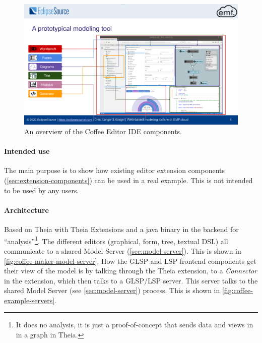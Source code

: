 \begin{figure}[htbp] 
  \centering
  \includegraphics[width=\textwidth]{figures/coffee-maker-example}
  \caption[Coffee Editor IDE Overview]{An overview of the Coffee Editor IDE components.\cite[p.~4]{philiplangerWebbasedModelingTools2020}}\label{fig:coffee-editor-overview}
\end{figure}

\paragraph*{Intended use}
The main purpose is to show how existing editor extension components (\cref{sec:extension-components}) can be used in a real example.
This is not intended to be used by any users.

\paragraph*{Architecture}
Based on Theia with Theia Extensions and a java binary in the backend for ``analysis''\footnote{It does no analysis, it is just a proof-of-concept that sends data and views in in a graph in Theia.}.
The different editors (graphical, form, tree, textual DSL) all communicate to a shared Model Server (\cref{sec:model-server}).
This is shown in \cref{fig:coffee-maker-model-server}.
How the \gls{GLSP} and \gls{LSP} frontend components get their view of the model is by talking through the Theia extension, to a \emph{Connector} in the extension, which then talks to a \gls{GLSP}/\gls{LSP} server.
This server talks to the shared Model Server (see \cref{sec:model-server}) process. This is shown in \cref{fig:coffee-example-servers}.

